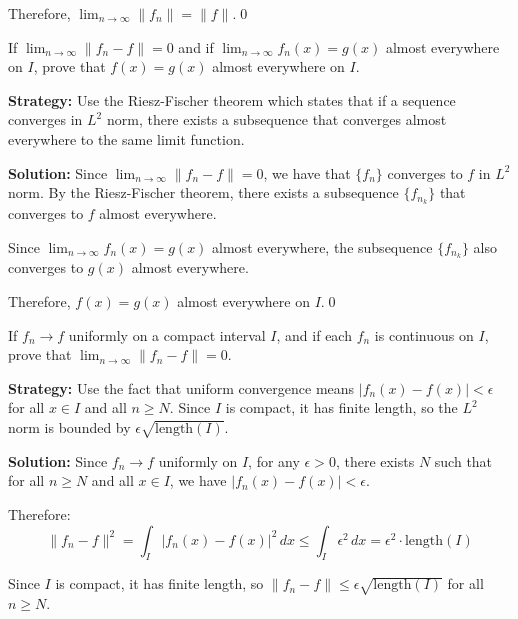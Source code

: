 Therefore, $\lim_{n \to \infty} \| f_n \| = \| f \|$.\qed


\begin{problembox}
\begin{problemstatement}
If $\lim_{n \to \infty} \| f_n - f \| = 0$ and if $\lim_{n \to \infty} f_n(x) = g(x)$ almost everywhere on $I$, prove that $f(x) = g(x)$ almost everywhere on $I$.
\end{problemstatement}
\end{problembox}

\noindent\textbf{Strategy:} Use the Riesz-Fischer theorem which states that if a sequence converges in $L^2$ norm, there exists a subsequence that converges almost everywhere to the same limit function.

\bigskip\noindent\textbf{Solution:}
Since $\lim_{n \to \infty} \| f_n - f \| = 0$, we have that $\{f_n\}$ converges to $f$ in $L^2$ norm. By the Riesz-Fischer theorem, there exists a subsequence $\{f_{n_k}\}$ that converges to $f$ almost everywhere.

Since $\lim_{n \to \infty} f_n(x) = g(x)$ almost everywhere, the subsequence $\{f_{n_k}\}$ also converges to $g(x)$ almost everywhere.

Therefore, $f(x) = g(x)$ almost everywhere on $I$.\qed


\begin{problembox}
\begin{problemstatement}
If $f_n \to f$ uniformly on a compact interval $I$, and if each $f_n$ is continuous on $I$, prove that $\lim_{n \to \infty} \| f_n - f \| = 0$.
\end{problemstatement}
\end{problembox}

\noindent\textbf{Strategy:} Use the fact that uniform convergence means $|f_n(x) - f(x)| < \epsilon$ for all $x \in I$ and all $n \geq N$. Since $I$ is compact, it has finite length, so the $L^2$ norm is bounded by $\epsilon \sqrt{\text{length}(I)}$.

\bigskip\noindent\textbf{Solution:}
Since $f_n \to f$ uniformly on $I$, for any $\epsilon > 0$, there exists $N$ such that for all $n \geq N$ and all $x \in I$, we have $|f_n(x) - f(x)| < \epsilon$.

Therefore:
\[\| f_n - f \|^2 = \int_I |f_n(x) - f(x)|^2 \, dx \leq \int_I \epsilon^2 \, dx = \epsilon^2 \cdot \text{length}(I)\]

Since $I$ is compact, it has finite length, so $\| f_n - f \| \leq \epsilon \sqrt{\text{length}(I)}$ for all $n \geq N$.

